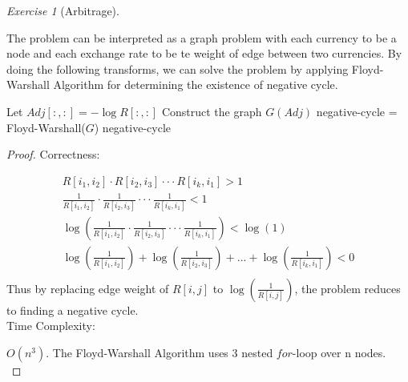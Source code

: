 \documentclass[a4paper,10pt,twoside]{article}
\theoremstyle{plain}
\theoremstyle{definition}
\theoremstyle{remark}
\newtheorem{exercise}{Exercise}
\begin{document}
\begin{exercise}[Arbitrage]\

The problem can be interpreted as a graph problem with each currency to be a node and each exchange rate to be te weight of edge between two currencies. 
By doing the following transforms, we can solve the problem by applying Floyd-Warshall Algorithm for determining the existence of negative cycle.

\begin{algorithm}[H]
\caption{Arbitrage Opportunity($R[:, :]$)}
\label{algo:negative-arbitrage}
	Let $Adj[:, :] = -\log R[:,:]$ 
	Construct the graph $G(Adj)$\;
	negative-cycle = Floyd-Warshall($G$)\;
	\Return negative-cycle
\end{algorithm}
\begin{proof}
Correctness:

 \[
 	\begin{aligned}
		R[i_1, i_2] \cdot R[i_2, i_3] \cdot \cdot \cdot R[i_k, i_1] > 1 \\
 		\frac{1}{R[i_1, i_2]} \cdot \frac{1}{R[i_2, i_3]} \cdot \cdot \cdot \frac{1}{R[i_k, i_1]} < 1 \\
		\log(\frac{1}{R[i_1, i_2]} \cdot \frac{1}{R[i_2, i_3]} \cdot \cdot \cdot \frac{1}{R[i_k, i_1]}) < \log(1) \\
		\log(\frac{1}{R[i_1, i_2]}) + \log(\frac{1}{R[i_2, i_3]}) + ... + \log(\frac{1}{R[i_k, i_1]}) < 0 \\
 	\end{aligned}
 \]
Thus by replacing edge weight of $R[i, j]$ to $\log(\frac{1}{R[i, j]})$, the problem reduces to finding a negative cycle.\\

Time Complexity:

$O(n^3)$. 
The Floyd-Warshall Algorithm uses 3 nested $for$-loop over n nodes.\\
\end{proof}
\end{exercise}
\end{document}
